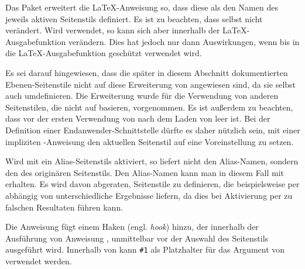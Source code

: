 \begin{Declaration}
\end{Declaration}
Das Paket  erweitert die \LaTeX-Anweisung
 so, dass diese
 als den Namen des jeweils aktiven Seitenstils
definiert. Es ist zu beachten, dass
 selbst
 nicht verändert. Wird
 verwendet, so kann sich
 aber innerhalb der \LaTeX-Ausgabefunktion
verändern. Dies hat jedoch nur dann Auswirkungen, wenn
 bis in die \LaTeX-Ausgabefunktion geschützt verwendet
wird.

Es sei darauf hingewiesen, dass die später in diesem Abschnitt dokumentierten
Ebenen-Seitenstile nicht auf diese Erweiterung von
 angewiesen sind, da sie selbst auch
 umdefinieren. Die Erweiterung wurde für die
Verwendung von anderen Seitenstilen, die nicht auf 
basieren, vorgenommen. Es ist außerdem zu beachten, dass
 vor der ersten Verwendung von
 nach dem Laden von  leer
ist. Bei der Definition einer Endanwender-Schnittstelle dürfte es daher
nützlich sein, mit einer impliziten -Anweisung
den aktuellen Seitenstil auf eine Voreinstellung zu setzen.%

Wird mit  ein Alias-Seitenstils aktiviert, so
liefert  nicht den Alias-Namen, sondern den des
originären Seitenstils. Den Alias-Namen
kann man in diesem Fall mit  erhalten. Es wird davon
abgeraten, Seitenstile zu definieren, die beispielsweise per
 abhängig von 
unterschiedliche Ergebnisse liefern, da dies bei Aktivierung per
 zu falschen Resultaten führen kann.%
\EndIndexGroup


\begin{Declaration}
\end{Declaration}
Die Anweisung  fügt einem Haken
(engl. \emph{hook})  hinzu, der innerhalb der Ausführung von
Anweisung %
, unmittelbar
vor der Auswahl des Seitenstils ausgeführt wird. Innerhalb von 
kann \texttt{\#1} als Platzhalter für das Argument von
 verwendet werden.

